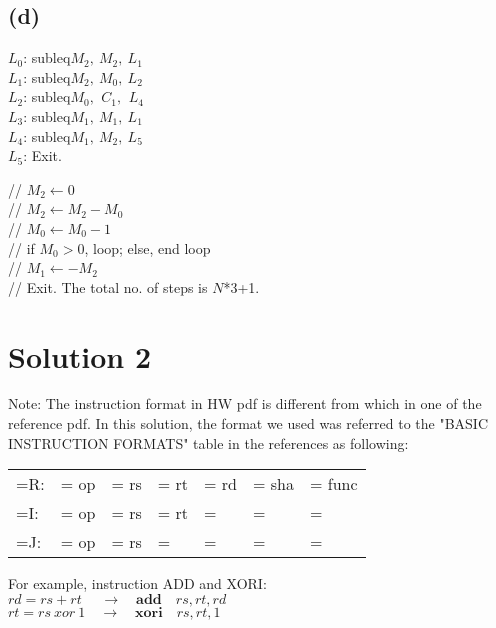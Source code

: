 \documentclass[a4paper, 11pt]{article}
\begin{document}
\subsection*{(d)}
\begin{multicols}{2}
		$L_0$: subleq\quad $M_2,\ M_2,\ L_1$\\[5pt]
\indent $L_1$: subleq\quad $M_2,\ M_0,\ L_2$\\[5pt]
\indent $L_2$: subleq\quad $M_0,\ \,C_1,\ \,L_4$\\[5pt]
\indent $L_3$: subleq\quad $M_1,\ M_1,\ L_1$\\[5pt]
\indent $L_4$: subleq\quad $M_1,\ M_2,\ L_5$\\[5pt]
\indent $L_5$: Exit. \\
\columnbreak

\noindent // $M_2 \leftarrow 0$\\[5pt]
// $M_2 \leftarrow M_2 - M_0$\\[5pt]
// $M_0 \leftarrow M_0 - 1$\\[5pt]
// if $M_0 > 0$, loop; else, end loop\\[5pt]
// $M_1 \leftarrow - M_2$\\[5pt]
// Exit. The total no. of steps is $N$*3+1.\\
\end{multicols}


\section*{Solution 2}

\noindent Note: The instruction format in HW pdf is different from which in one of the reference pdf. In this solution, the format we used was referred to the "BASIC INSTRUCTION FORMATS" table in the references as following:
\begin{center}
  \begin{tabularx}{0.7\textwidth}{>{\hsize=\hsize}X *{6}{| *{1}{>{\hsize=\hsize\centering\arraybackslash}X} } |}
      R: & op & rs & rt & rd & sha & func\\
      I: & op & rs & rt & \\
      J: & op & rs & \\
      \end{tabularx}
\end{center}
For example, instruction ADD and XORI:\\[5pt]
\indent $rd = rs + rt \hspace{16pt} \rightarrow \quad \textbf{add}\quad rs, rt, rd$\\
\indent $rt = rs\ xor\ 1 \quad \rightarrow \quad \textbf{xori}\quad rs, rt, 1$\\
\end{document}
